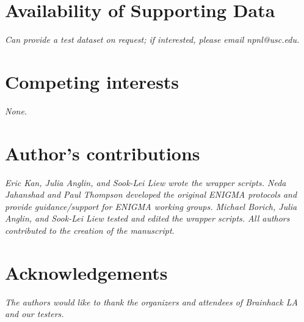 \documentclass[twocolumn]{bmcart}%
\begin{document}
\begin{backmatter}

\section*{Availability of Supporting Data}
\emph{Can provide a test dataset on request; if interested, please email npnl@usc.edu.} 

\section*{Competing interests}
\emph{None.}

\section*{Author's contributions}
\emph{Eric Kan, Julia Anglin, and Sook-Lei Liew wrote the wrapper scripts. Neda Jahanshad and Paul Thompson developed the original ENIGMA protocols and provide guidance/support for ENIGMA working groups. Michael Borich, Julia Anglin, and Sook-Lei Liew tested and edited the wrapper scripts. All authors contributed to the creation of the manuscript.}

\section*{Acknowledgements}
\emph{The authors would like to thank the organizers and attendees of Brainhack LA and our testers.}

  
  



\end{backmatter}
\end{document}
